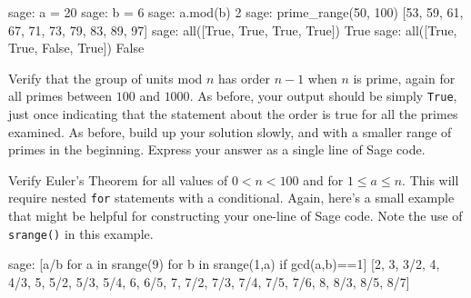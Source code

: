 %
\begin{sageexample}
sage: a = 20
sage: b = 6
sage: a.mod(b)
2
sage: prime_range(50, 100)
[53, 59, 61, 67, 71, 73, 79, 83, 89, 97]
sage: all([True, True, True, True])
True
sage: all([True, True, False, True])
False
\end{sageexample}
%
\begin{sageverbatim}\end{sageverbatim}
%
%
Verify that the group of units mod $n$ has order $n-1$ when $n$ is prime, again for all primes between $100$ and $1000$.  As before, your output should be simply \verb?True?, just once indicating that the statement about the order is true for all the primes examined.  As before, build up your solution slowly, and with a smaller range of primes in the beginning.  Express your answer as a single line of Sage code.
\begin{sageverbatim}\end{sageverbatim}
%
%
Verify Euler's Theorem for all values of $0<n<100$ and for $1\leq a \leq n$.  This will require nested \verb?for? statements with a conditional.  Again, here's a small example that might be helpful for constructing your one-line of Sage code.  Note the use of \verb?srange()? in this example.
%
\begin{sageexample}
sage: [a/b for a in srange(9) for b in srange(1,a) if gcd(a,b)==1]
[2, 3, 3/2, 4, 4/3, 5, 5/2, 5/3, 5/4, 6, 6/5,
 7, 7/2, 7/3, 7/4, 7/5, 7/6, 8, 8/3, 8/5, 8/7]
\end{sageexample}
%
\begin{sageverbatim}\end{sageverbatim}
%

